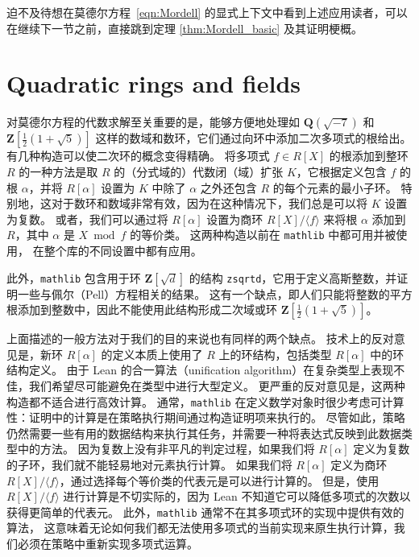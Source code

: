 \documentclass[sigplan,10pt,nonacm,
screen]{acmart} \settopmatter{printfolios=true,printccs=false,printacmref=false}
\newcommand{\mathlib}{\lstinline{mathlib}\xspace}
\newcommand{\QQ}{\mathbf{Q}}
\newcommand{\ZZ}{\mathbf{Z}}
\begin{document}
迫不及待想在莫德尔方程~\eqref{eqn:Mordell} 的显式上下文中看到上述应用读者，可以在继续下一节之前，直接跳到定理 \ref{thm:Mordell_basic} 及其证明梗概。

\section{Quadratic rings and fields}\label{sec:QuadraticRings}

对莫德尔方程的代数求解至关重要的是，能够方便地处理如 $\QQ(\sqrt{-7})$ 和 $\ZZ\left[\frac{1}{2}(1 + \sqrt{5})\right]$ 这样的数域和数环，它们通过向环中添加二次多项式的根给出。
有几种构造可以使二次环的概念变得精确。
将多项式 $f \in R[X]$ 的根添加到整环 $R$ 的一种方法是取 $R$ 的（分式域的）代数闭（域）扩张 $K$，它根据定义包含 $f$ 的根 $\alpha$，并将 $R[\alpha]$ 设置为 $K$ 中除了 $\alpha$ 之外还包含 $R$ 的每个元素的最小子环。
特别地，这对于数环和数域非常有效，因为在这种情况下，我们总是可以将 $K$ 设置为复数。
或者，我们可以通过将 $R[\alpha]$ 设置为商环 $R[X] / \langle f\rangle$ 来将根 $\alpha$ 添加到 $R$，其中 $\alpha$ 是 $X \bmod f$ 的等价类。
这两种构造以前在 \mathlib 中都可用并被使用，
在整个库的不同设置中都有应用。

此外，\mathlib 包含用于环 $\ZZ[\sqrt d]$ 的结构 \lstinline{zsqrtd}，它用于定义高斯整数，并证明一些与佩尔（Pell）方程相关的结果。
这有一个缺点，即人们只能将整数的平方根添加到整数中，因此不能使用此结构形成二次域或环 $\ZZ\left[\frac{1}{2}(1 + \sqrt{5})\right]$。

上面描述的一般方法对于我们的目的来说也有同样的两个缺点。
技术上的反对意见是，新环 $R[\alpha]$ 的定义本质上使用了 $R$ 上的环结构，包括类型 $R[\alpha]$ 中的环结构定义。
由于 Lean 的合一算法（unification algorithm）在复杂类型上表现不佳，我们希望尽可能避免在类型中进行大型定义。
更严重的反对意见是，这两种构造都不适合进行高效计算。
通常，\mathlib 在定义数学对象时很少考虑可计算性：证明中的计算是在策略执行期间通过构造证明项来执行的。
尽管如此，策略仍然需要一些有用的数据结构来执行其任务，并需要一种将表达式反映到此数据类型中的方法。
因为复数上没有非平凡的判定过程，如果我们将 $R[\alpha]$ 定义为复数的子环，我们就不能轻易地对元素执行计算。
如果我们将 $R[\alpha]$ 定义为商环 $R[X] / \langle f \rangle$，通过选择每个等价类的代表元是可以进行计算的。
但是，使用 $R[X] / \langle f\rangle$ 进行计算是不切实际的，因为 Lean 不知道它可以降低多项式的次数以获得更简单的代表元。
此外，\mathlib 通常不在其多项式环的实现中提供有效的算法，
这意味着无论如何我们都无法使用多项式的当前实现来原生执行计算，我们必须在策略中重新实现多项式运算。
\end{document}
